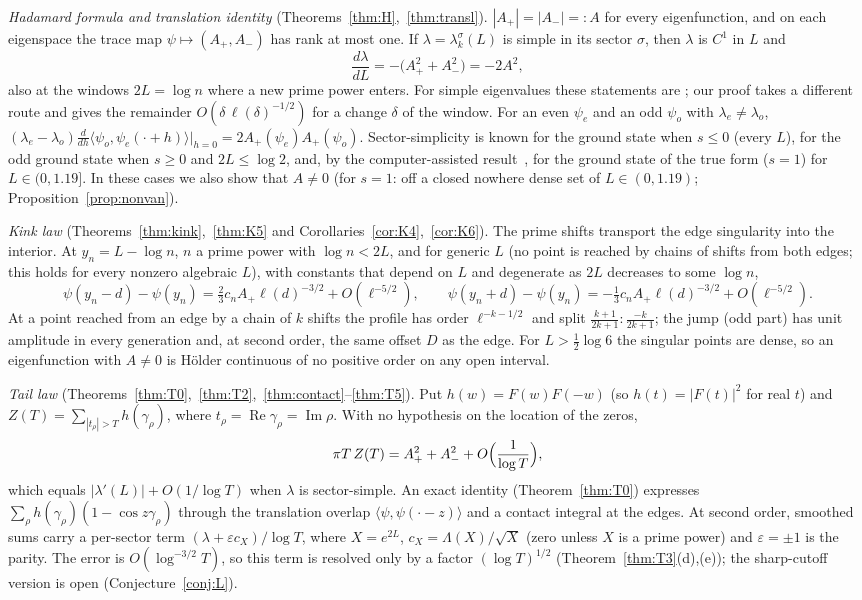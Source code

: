 \documentclass[11pt]{amsart}
\newcommand{\eps}{\varepsilon}
\DeclareMathOperator{\re}{Re}
\DeclareMathOperator{\im}{Im}
\theoremstyle{definition}
\theoremstyle{remark}
\numberwithin{equation}{section}
\begin{document}
\emph{Hadamard formula and translation identity} (Theorems~\ref{thm:H},~\ref{thm:transl}). $|A_+|=|A_-|=:A$ for every eigenfunction, and on each eigenspace the trace map $\psi\mapsto(A_+,A_-)$ has rank at most one. If $\lambda=\lambda^\sigma_k(L)$ is simple in its sector $\sigma$, then $\lambda$ is $C^1$ in $L$ and
\[
\frac{d\lambda}{dL}=-\bigl(A_+^2+A_-^2\bigr)=-2A^2,
\]
also at the windows $2L=\log n$ where a new prime power enters. For simple eigenvalues these statements are \cite[Thms.~2.1--2.2]{BT26}; our proof takes a different route and gives the remainder $O(\delta\,\ell(\delta)^{-1/2})$ for a change $\delta$ of the window. For an even $\psi_e$ and an odd $\psi_o$ with $\lambda_e\ne\lambda_o$, $(\lambda_e-\lambda_o)\frac{d}{dh}\langle\psi_o,\psi_e(\cdot+h)\rangle|_{h=0}=2A_+(\psi_e)A_+(\psi_o)$. Sector-simplicity is known for the ground state when $s\le0$ (every $L$), for the odd ground state when $s\ge0$ and $2L\le\log2$, and, by the computer-assisted result~\cite{GS}, for the ground state of the true form ($s=1$) for $L\in(0,1.19]$. In these cases we also show that $A\neq0$ (for $s=1$: off a closed nowhere dense set of $L\in(0,1.19)$; Proposition~\ref{prop:nonvan}).

\emph{Kink law} (Theorems~\ref{thm:kink},~\ref{thm:K5} and Corollaries~\ref{cor:K4},~\ref{cor:K6}). The prime shifts transport the edge singularity into the interior. At $y_n=L-\log n$, $n$ a prime power with $\log n<2L$, and for generic $L$ (no point is reached by chains of shifts from both edges; this holds for every nonzero algebraic $L$), with constants that depend on $L$ and degenerate as $2L$ decreases to some $\log n$,
\[
\psi(y_n-d)-\psi(y_n)=\tfrac23c_nA_+\ell(d)^{-3/2}+O(\ell^{-5/2}),\qquad\psi(y_n+d)-\psi(y_n)=-\tfrac13c_nA_+\ell(d)^{-3/2}+O(\ell^{-5/2}).
\]
At a point reached from an edge by a chain of $k$ shifts the profile has order $\ell^{-k-1/2}$ and split $\frac{k+1}{2k+1}:\frac{-k}{2k+1}$; the jump (odd part) has unit amplitude in every generation and, at second order, the same offset $D$ as the edge. For $L>\frac12\log6$ the singular points are dense, so an eigenfunction with $A\ne0$ is H\"older continuous of no positive order on any open interval.

\emph{Tail law} (Theorems~\ref{thm:T0},~\ref{thm:T2},~\ref{thm:contact}--\ref{thm:T5}). Put $h(w)=F(w)F(-w)$ (so $h(t)=|F(t)|^2$ for real $t$) and $Z(T)=\sum_{|t_\rho|>T}h(\gamma_\rho)$, where $t_\rho=\re\gamma_\rho=\im\rho$. With no hypothesis on the location of the zeros,
\[
\pi T\,Z(T)=A_+^2+A_-^2+O\Bigl(\frac1{\log T}\Bigr),
\]
which equals $|\lambda'(L)|+O(1/\log T)$ when $\lambda$ is sector-simple. An exact identity (Theorem~\ref{thm:T0}) expresses $\sum_\rho h(\gamma_\rho)(1-\cos z\gamma_\rho)$ through the translation overlap $\langle\psi,\psi(\cdot-z)\rangle$ and a contact integral at the edges. At second order, smoothed sums carry a per-sector term $(\lambda+\eps c_X)/\log T$, where $X=e^{2L}$, $c_X=\Lambda(X)/\sqrt X$ (zero unless $X$ is a prime power) and $\eps=\pm1$ is the parity. The error is $O(\log^{-3/2}T)$, so this term is resolved only by a factor $(\log T)^{1/2}$ (Theorem~\ref{thm:T3}(d),(e)); the sharp-cutoff version is open (Conjecture~\ref{conj:L}).
\end{document}
